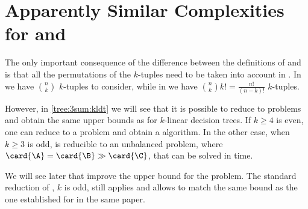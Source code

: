 \section{Apparently Similar Complexities for \kSUM and \kLDT}

The only important consequence of the difference between the definitions of
\kSUM and \kLDT is that all the permutations of the $k$-tuples need to be taken
into account in \kLDT. In \kSUM we have $\binom{n}{k}$ $k$-tuples to consider,
while in \kLDT we have $\binom{n}{k} k! = \frac{n!}{(n-k)!}$ $k$-tuples.

However, in \ref{tree:3sum:kldt} we will see that it is possible to reduce \kLDT to
\kSUM problems and obtain the same upper bounds as \kSUM for $k$-linear
decision trees. If $k \ge 4$ is even, one can reduce \kLDT to a \twoSUM problem
and obtain a  algorithm. In the other case, when
$k \ge 3$ is odd, \kLDT is reducible to an unbalanced \threeSUM problem, where
$\card{\A} = \card{\B} \gg \card{\C}$, that can be solved in
 time.

We will see later that \citet*{gronlund:2014} improve the upper bound for the
\threeSUM problem. The standard reduction of \kLDT, $k$ is odd, still applies
and allows to match the same 
bound as the one established for \threeSUM in the same paper.

